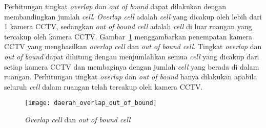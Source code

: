 Perhitungan tingkat \textit{overlap} dan \textit{out of bound} dapat dilakukan dengan membandingkan jumlah \textit{cell}. \textit{Overlap cell} adalah \textit{cell} yang dicakup oleh lebih dari 1 kamera CCTV, sedangkan \textit{out of bound cell} adalah \textit{cell} di luar ruangan yang tercakup oleh kamera CCTV. Gambar~\ref{fig:daerah_overlap_out_of_bound} menggambarkan penempatan kamera CCTV yang menghasilkan \textit{overlap cell} dan \textit{out of bound cell}. Tingkat \textit{overlap} dan \textit{out of bound} dapat dihitung dengan menjumlahkan semua \textit{cell} yang dicakup dari setiap kamera CCTV dan membaginya dengan jumlah \textit{cell} yang berada di dalam ruangan. Perhitungan tingkat \textit{overlap} dan \textit{out of bound} hanya dilakukan apabila seluruh \textit{cell} dalam ruangan telah tercakup oleh kamera CCTV.

\begin{figure}[h]
	\centering  
	\texttt{[image: daerah\_overlap\_out\_of\_bound]}
	\caption[\textit{Overlap cell} dan \textit{out of bound cell}]{\textit{Overlap cell} dan \textit{out of bound cell}}
	\label{fig:daerah_overlap_out_of_bound}
\end{figure}



